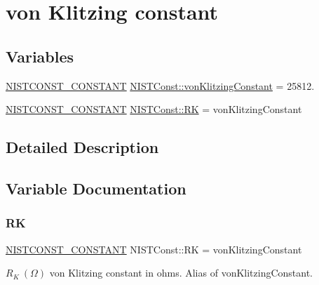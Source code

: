 \hypertarget{group___n_i_s_t_const-von_klitzing_constant}{}\section{von Klitzing constant}
\label{group___n_i_s_t_const-von_klitzing_constant}
\subsection*{Variables}
\begin{DoxyCompactItemize}
\item 
\mbox{\hyperlink{group___n_i_s_t_const-_macros_ga2b0fc1d7452373f816175dd86ce26729}{N\+I\+S\+T\+C\+O\+N\+S\+T\+\_\+\+C\+O\+N\+S\+T\+A\+NT}} \mbox{\hyperlink{group___n_i_s_t_const-von_klitzing_constant_ga1807b35d7b414619c32937c946fe16ed}{N\+I\+S\+T\+Const\+::von\+Klitzing\+Constant}} = 25812.
\item 
\mbox{\hyperlink{group___n_i_s_t_const-_macros_ga2b0fc1d7452373f816175dd86ce26729}{N\+I\+S\+T\+C\+O\+N\+S\+T\+\_\+\+C\+O\+N\+S\+T\+A\+NT}} \mbox{\hyperlink{group___n_i_s_t_const-von_klitzing_constant_ga6e2c6991900a678136a440c837138cb1}{N\+I\+S\+T\+Const\+::\+RK}} = von\+Klitzing\+Constant
\end{DoxyCompactItemize}


\subsection{Detailed Description}


\subsection{Variable Documentation}
\mbox{\label{group___n_i_s_t_const-von_klitzing_constant_ga6e2c6991900a678136a440c837138cb1}} 
\subsubsection{\texorpdfstring{RK}{RK}}
{\footnotesize\ttfamily \mbox{\hyperlink{group___n_i_s_t_const-_macros_ga2b0fc1d7452373f816175dd86ce26729}{N\+I\+S\+T\+C\+O\+N\+S\+T\+\_\+\+C\+O\+N\+S\+T\+A\+NT}} N\+I\+S\+T\+Const\+::\+RK = von\+Klitzing\+Constant}

$R_K \ (\Omega)$ von Klitzing constant in ohms. Alias of von\+Klitzing\+Constant. \mbox{\label{group___n_i_s_t_const-von_klitzing_constant_ga1807b35d7b414619c32937c946fe16ed}} 
